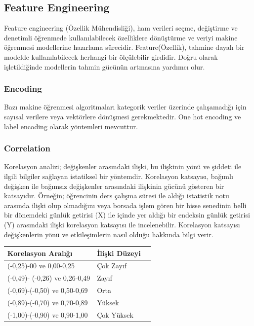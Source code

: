 \documentclass{article}
\begin{document}
\subsection{Feature Engineering}
Feature engineering (Özellik Mühendisliği), ham verileri seçme, değiştirme ve denetimli öğrenmede kullanılabilecek özelliklere dönüştürme ve veriyi makine öğrenmesi modellerine hazırlama sürecidir. Feature(Özellik), tahmine dayalı bir modelde kullanılabilecek herhangi bir ölçülebilir girdidir. Doğru olarak işletildiğinde modellerin tahmin gücünün artmasına yardımcı olur\cite{FE}.
\subsubsection{Encoding}
 Bazı makine öğrenmesi algoritmaları kategorik veriler üzerinde çalışamadığı için sayısal verilere veya vektörlere dönüşmesi gerekmektedir. One hot encoding ve label encoding olarak yöntemleri mevcuttur.
 \subsubsection{Correlation}
 Korelasyon analizi; değişkenler arasındaki ilişki, bu ilişkinin yönü ve şiddeti ile ilgili bilgiler sağlayan istatiksel bir yöntemdir.
 Korelasyon katsayısı, bağımlı değişken ile bağımsız değişkenler arasındaki ilişkinin gücünü gösteren bir katsayıdır. Örneğin; öğrencinin ders çalışma süresi ile aldığı istatistik notu arasında ilişki olup olmadığını veya borsada işlem gören bir hisse senedinin belli bir dönemdeki günlük getirisi (X) ile içinde yer aldığı bir endeksin günlük getirisi (Y) arasındaki ilişki korelasyon katsayısı ile incelenebilir. Korelasyon katsayısı değişkenlerin yönü ve etkileşimlerin nasıl olduğu hakkında bilgi verir\cite{KA}.
 \begin{center}
\begin{tabular}{ | m{5em} | m{1cm}| m{1cm} | } 
  \hline
 Korelasyon Aralığı& İlişki Düzeyi \\ 
  \hline
  (-0,25)-00 ve 0,00-0,25 & Çok Zayıf\\ 
  \hline
 (-0,49)- (-0,26) ve 0,26-0,49 & Zayıf \\ 
  \hline
  (-0,69)-(-0,50) ve 0,50-0,69 & Orta\\ 
  \hline
  (-0,89)-(-0,70) ve 0,70-0,89 & Yüksek\\ 
  \hline
   (-1,00)-(-0,90) ve 0,90-1,00 & Çok Yüksek\\ 
  \hline
\end{tabular}
\end{center}
\end{document}
